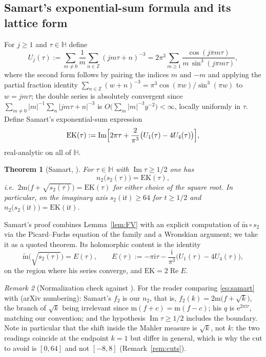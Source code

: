 \documentclass[11pt]{article}
\newtheorem{theorem}{Theorem}[section]
\theoremstyle{definition}
\theoremstyle{remark}
\newtheorem{remark}[theorem]{Remark}
\newcommand{\Hh}{\mathbb{H}}
\newcommand{\Zz}{\mathbb{Z}}
\newcommand{\ii}{\mathrm{i}}
\newcommand{\e}{\mathrm{e}}
\newcommand{\ImT}{\operatorname{Im}}
\newcommand{\ReT}{\operatorname{Re}}
\newcommand{\m}{\mathrm{m}}
\newcommand{\mt}{\widetilde{\m}}
\begin{document}
\subsection{Samart's exponential-sum formula and its lattice form}\label{subsec:EK}

For $j\ge1$ and $\tau\in\Hh$ define
\begin{equation}\label{eq:Uj}
  U_j(\tau):=\sum_{m\neq0}\frac1m\sum_{n\in\Zz}(jm\tau+n)^{-3}
  =2\pi^3\sum_{m\ge1}\frac{\cos(j\pi m\tau)}{m\,\sin^3(j\pi m\tau)},
\end{equation}
where the second form follows by pairing the indices $m$ and $-m$ and
applying the partial fraction identity
$\sum_{n\in\Zz}(w+n)^{-3}=\pi^3\cos(\pi w)/\sin^3(\pi w)$
to $w=jm\tau$; the double series is absolutely convergent since
$\sum_{m\neq0}|m|^{-1}\sum_n|jm\tau+n|^{-3}$
is $O\bigl(\sum_m|m|^{-3}y^{-2}\bigr)<\infty$, locally uniformly in $\tau$.
Define Samart's exponential-sum expression
\begin{equation}\label{eq:EK}
  \mathrm{EK}(\tau):=\ImT\Bigl[2\pi\tau+\frac{2}{\pi^3}\bigl(U_1(\tau)-4U_4(\tau)\bigr)\Bigr],
\end{equation}
real-analytic on all of $\Hh$.

\begin{theorem}[Samart, {\cite[Prop.~2.1(i)]{Sa13}}]\label{thm:samart}
For $\tau\in\Hh$ with $\ImT\tau\ge 1/2$ one has
\begin{equation}\label{eq:samart}
  n_2\bigl(s_2(\tau)\bigr)=\mathrm{EK}(\tau),
\end{equation}
i.e.\ $2\m\bigl(f+\sqrt{s_2(\tau)}\bigr)=\mathrm{EK}(\tau)$ for either
choice of the square root. In particular, on the imaginary axis
$s_2(\ii t)\ge64$ for $t\ge1/2$ and $n_2\bigl(s_2(\ii t)\bigr)=\mathrm{EK}(\ii t)$.
\end{theorem}

Samart's proof combines Lemma~\ref{lem:FV} with an explicit computation of
$\mt\circ s_2$ via the Picard--Fuchs equation of the family and a
Wronskian argument; we take it as a quoted theorem. Its holomorphic
content is the identity
\begin{equation}\label{eq:mtilde}
  \mt\bigl(\sqrt{s_2(\tau)}\bigr)=E(\tau),
  \qquad
  E(\tau):=-\pi \ii\tau-\frac{\ii}{\pi^3}\bigl(U_1(\tau)-4U_4(\tau)\bigr),
\end{equation}
on the region where his series converge, and $\mathrm{EK}=2\ReT E$.

\begin{remark}[Normalization check against \cite{Sa13}]\label{rem:samartdict}
For the reader comparing \eqref{eq:samart} with
\cite[Prop.~2.1(i)]{Sa13} (arXiv numbering): Samart's $f_2$ is our
$n_2$, that is, $f_2(k)=2\m\bigl(f+\sqrt{k}\bigr)$, the branch of
$\sqrt{k}$ being irrelevant since $\m(f+c)=\m(f-c)$; his $q$ is
$\e^{2\pi\ii\tau}$, matching our convention; and the hypothesis
$\ImT\tau\ge 1/2$ includes the boundary. Note in particular that the
shift inside the Mahler measure is $\sqrt{k}$, not $k$: the two
readings coincide at the endpoint $k=1$ but differ in general, which
is why the cut to avoid is $[0,64]$ and not $[-8,8]$
(Remark~\ref{rem:cuts}).
\end{remark}
\end{document}
